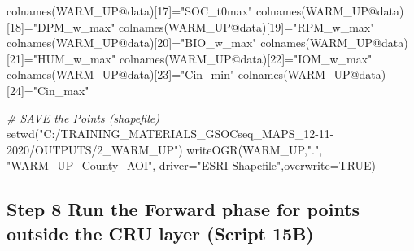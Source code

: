 \documentclass[
  10pt,
  b5paper,
]{book}
\newenvironment{Shaded}{\begin{snugshade}}{\end{snugshade}}
\newcommand{\AttributeTok}[1]{\textcolor[rgb]{0.77,0.63,0.00}{#1}}
\newcommand{\CommentTok}[1]{\textcolor[rgb]{0.56,0.35,0.01}{\textit{#1}}}
\newcommand{\ConstantTok}[1]{\textcolor[rgb]{0.00,0.00,0.00}{#1}}
\newcommand{\DecValTok}[1]{\textcolor[rgb]{0.00,0.00,0.81}{#1}}
\newcommand{\FunctionTok}[1]{\textcolor[rgb]{0.00,0.00,0.00}{#1}}
\newcommand{\NormalTok}[1]{#1}
\newcommand{\OtherTok}[1]{\textcolor[rgb]{0.56,0.35,0.01}{#1}}
\newcommand{\SpecialCharTok}[1]{\textcolor[rgb]{0.00,0.00,0.00}{#1}}
\newcommand{\StringTok}[1]{\textcolor[rgb]{0.31,0.60,0.02}{#1}}
\begin{document}
\begin{Shaded}
\begin{Highlighting}[]
\FunctionTok{colnames}\NormalTok{(WARM\_UP}\SpecialCharTok{@}\NormalTok{data)[}\DecValTok{17}\NormalTok{]}\OtherTok{=}\StringTok{"SOC\_t0max"}
\FunctionTok{colnames}\NormalTok{(WARM\_UP}\SpecialCharTok{@}\NormalTok{data)[}\DecValTok{18}\NormalTok{]}\OtherTok{=}\StringTok{"DPM\_w\_max"}
\FunctionTok{colnames}\NormalTok{(WARM\_UP}\SpecialCharTok{@}\NormalTok{data)[}\DecValTok{19}\NormalTok{]}\OtherTok{=}\StringTok{"RPM\_w\_max"}
\FunctionTok{colnames}\NormalTok{(WARM\_UP}\SpecialCharTok{@}\NormalTok{data)[}\DecValTok{20}\NormalTok{]}\OtherTok{=}\StringTok{"BIO\_w\_max"}
\FunctionTok{colnames}\NormalTok{(WARM\_UP}\SpecialCharTok{@}\NormalTok{data)[}\DecValTok{21}\NormalTok{]}\OtherTok{=}\StringTok{"HUM\_w\_max"}
\FunctionTok{colnames}\NormalTok{(WARM\_UP}\SpecialCharTok{@}\NormalTok{data)[}\DecValTok{22}\NormalTok{]}\OtherTok{=}\StringTok{"IOM\_w\_max"}
\FunctionTok{colnames}\NormalTok{(WARM\_UP}\SpecialCharTok{@}\NormalTok{data)[}\DecValTok{23}\NormalTok{]}\OtherTok{=}\StringTok{"Cin\_min"}
\FunctionTok{colnames}\NormalTok{(WARM\_UP}\SpecialCharTok{@}\NormalTok{data)[}\DecValTok{24}\NormalTok{]}\OtherTok{=}\StringTok{"Cin\_max"}


\CommentTok{\# SAVE the Points (shapefile)}
\FunctionTok{setwd}\NormalTok{(}\StringTok{"C:/TRAINING\_MATERIALS\_GSOCseq\_MAPS\_12{-}11{-}2020/OUTPUTS/2\_WARM\_UP"}\NormalTok{)}
\FunctionTok{writeOGR}\NormalTok{(WARM\_UP,}\StringTok{"."}\NormalTok{, }\StringTok{"WARM\_UP\_County\_AOI"}\NormalTok{, }\AttributeTok{driver=}\StringTok{"ESRI Shapefile"}\NormalTok{,}\AttributeTok{overwrite=}\ConstantTok{TRUE}\NormalTok{)}
\end{Highlighting}
\end{Shaded}

\hypertarget{step-8-run-the-forward-phase-for-points-outside-the-cru-layer-script-15b}{%
\subsection*{Step 8 Run the Forward phase for points outside the CRU layer (Script 15B)}\label{step-8-run-the-forward-phase-for-points-outside-the-cru-layer-script-15b}}
\end{document}
